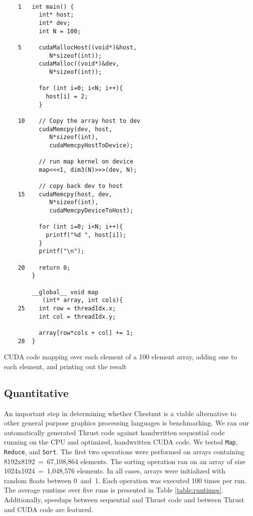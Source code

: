 \documentclass[twocolumn]{article}
\renewcommand{\|}{\origbar} %
\newcommand{\code}[1]{\texttt{#1}}
\begin{document}
\begin{Code Snippet}
\begin{verbatim}
 
    1   int main() {
          int* host;
          int* dev;
          int N = 100;
     
    5     cudaMallocHost((void*)&host, 
             N*sizeof(int));
          cudaMalloc((void*)&dev, 
             N*sizeof(int));
      
          for (int i=0; i<N; i++){
            host[i] = 2;
          }
 
    10    // Copy the array host to dev
          cudaMemcpy(dev, host, 
             N*sizeof(int),
             cudaMemcpyHostToDevice);
 
          // run map kernel on device
          map<<<1, dim3(N)>>>(dev, N);
 
          // copy back dev to host
    15    cudaMemcpy(host, dev, 
             N*sizeof(int),
             cudaMemcpyDeviceToHost);
      
          for (int i=0; i<N; i++){
            printf("%d ", host[i]);
          }
          printf("\n");
      
    20    return 0;
        }
 
        __global__ void map
           (int* array, int cols){
    25    int row = threadIdx.x;
          int col = threadIdx.y;
       
          array[row*cols + col] += 1;
    28  }                                    
\end{verbatim}
\caption{CUDA code mapping over each element of a 100 element array, adding one to each element, and printing out the result}
\label{code:cudaExperiment}
\end{Code Snippet}

\subsection{Quantitative}

An important step in determining whether Chestnut is a viable alternative to other general purpose graphics processing languages is benchmarking. We ran our automatically generated Thrust code against handwritten sequential code running on the CPU and optimized, handwritten CUDA code. We tested \code{Map}, \code{Reduce}, and \code{Sort}. The first two operations were performed on arrays containing 8192x8192~=~67,108,864 elements. The sorting operation ran on an array of size 1024x1024~=~1,048,576 elements. In all cases, arrays were initialized with random floats between 0~and~1. Each operation was executed 100 times per run. The average runtime over five runs is presented in Table \ref{table:runtimes}. Additionally, speedups between sequential and Thrust code and between Thrust and CUDA code are featured.
\end{document}
